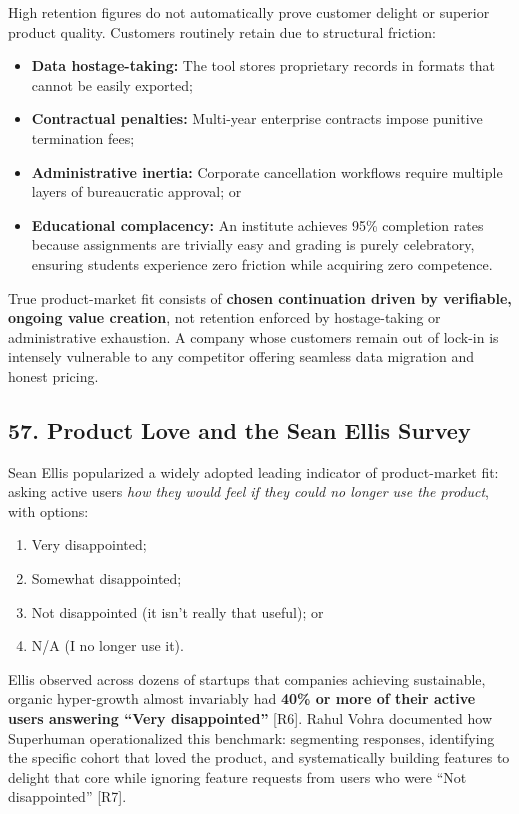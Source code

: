 High retention figures do not automatically prove customer delight or superior product quality. Customers routinely retain due to structural friction:
\begin{itemize}
    \item \textbf{Data hostage-taking:} The tool stores proprietary records in formats that cannot be easily exported;
    \item \textbf{Contractual penalties:} Multi-year enterprise contracts impose punitive termination fees;
    \item \textbf{Administrative inertia:} Corporate cancellation workflows require multiple layers of bureaucratic approval; or
    \item \textbf{Educational complacency:} An institute achieves 95\% completion rates because assignments are trivially easy and grading is purely celebratory, ensuring students experience zero friction while acquiring zero competence.
\end{itemize}

True product-market fit consists of \textbf{chosen continuation driven by verifiable, ongoing value creation}, not retention enforced by hostage-taking or administrative exhaustion. A company whose customers remain out of lock-in is intensely vulnerable to any competitor offering seamless data migration and honest pricing.

\subsection*{57. Product Love and the Sean Ellis Survey}

Sean Ellis popularized a widely adopted leading indicator of product-market fit: asking active users \emph{how they would feel if they could no longer use the product}, with options:
\begin{enumerate}
    \item Very disappointed;
    \item Somewhat disappointed;
    \item Not disappointed (it isn't really that useful); or
    \item N/A (I no longer use it).
\end{enumerate}

Ellis observed across dozens of startups that companies achieving sustainable, organic hyper-growth almost invariably had \textbf{40\% or more of their active users answering ``Very disappointed''} [R6]. Rahul Vohra documented how Superhuman operationalized this benchmark: segmenting responses, identifying the specific cohort that loved the product, and systematically building features to delight that core while ignoring feature requests from users who were ``Not disappointed'' [R7].

